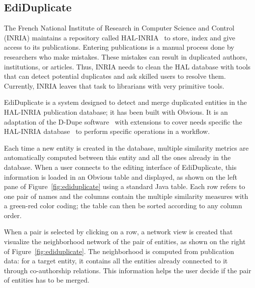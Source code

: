 \subsection{EdiDuplicate}

The French National Institute of Research in Computer Science and
Control (INRIA) maintains a repository called HAL-INRIA~\cite{HAL} to
store, index and give access to its publications.  Entering
publications is a manual process done by researchers who make
mistakes.  These mistakes can result in duplicated authors,
institutions, or articles. Thus, INRIA needs to clean the HAL database
with tools that can detect potential duplicates and ask skilled users
to resolve them.  Currently, INRIA leaves that task to librarians with
very primitive tools.

EdiDuplicate is a  system designed to detect and merge duplicated
entities in the HAL-INRIA publication database; it has been built
with Obvious.  It is an adaptation of the D-Dupe software~\cite{DDupe}
with extensions to cover needs specific the HAL-INRIA
database~\cite{HAL} to perform specific operations in a workflow.

Each time a new entity is created in the database, multiple similarity
metrics are automatically computed between this entity and all the ones
already in the database.  When a user connects to the editing
interface of EdiDuplicate, this information is loaded in an Obvious
table and displayed, as shown on the left pane of
Figure~\ref{fig:ediduplicate} using a standard Java table.  Each row
refers to one pair of names and the columns contain the multiple
similarity measures with a green-red color coding; the table can
then be sorted according to any column order.

When a pair is selected by clicking on a row, a network view is created
that visualize the neighborhood network of the pair of entities, as
shown on the right of Figure~\ref{fig:ediduplicate}.  The
neighborhood is computed from publication data: for a target entity,
it contains all the entities already connected to it through
co-authorship relations.  This information helps the user decide if
the pair of entities has to be merged.


